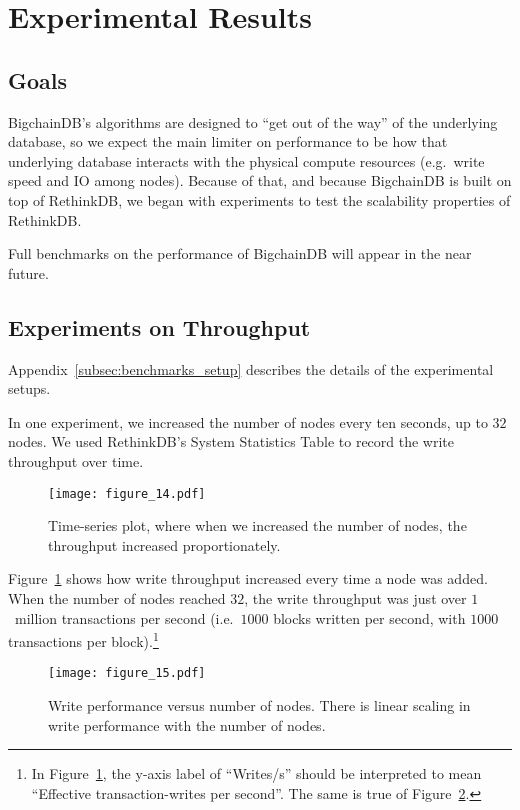 \section{Experimental Results}\label{sec:benchmarks}

\subsection{Goals}

BigchainDB's algorithms are designed to ``get out of the way'' of the underlying database, so we expect the main limiter on performance to be how that underlying database interacts with the physical compute resources (e.g.~write speed and IO among nodes).
Because of that, and because BigchainDB is built on top of RethinkDB, we began with experiments to test the scalability properties of RethinkDB.

Full benchmarks on the performance of BigchainDB will appear in the near future.

\subsection{Experiments on Throughput}

Appendix~\ref{subsec:benchmarks_setup} describes the details of the experimental setups.

In one experiment, we increased the number of nodes every ten seconds, up to $32$ nodes.
We used RethinkDB's System Statistics Table to record the write throughput over time.

\begin{figure}[!ht]
  \centering
  \texttt{[image: figure\_14.pdf]}
  \caption{Time-series plot, where when we increased the number of nodes, the throughput increased proportionately.}
  \label{fig:bigchain_throughput_vs_nodes}
\end{figure}

Figure~\ref{fig:bigchain_throughput_vs_nodes} shows how write throughput increased every time a node was added.
When the number of nodes reached $32$, the write throughput was just over $1$~million transactions per second (i.e.~$1000$ blocks written per second, with $1000$ transactions per block).\footnote{
In Figure~\ref{fig:bigchain_throughput_vs_nodes}, the y-axis label of ``Writes/s'' should be interpreted to mean ``Effective transaction-writes per second''. The same is true of Figure~\ref{fig:bigchain_writes_vs_nodes}.}

\begin{figure}[!ht]
  \centering
  \texttt{[image: figure\_15.pdf]}
  \caption{Write performance versus number of nodes. There is linear scaling in write performance with the number of nodes.}
  \label{fig:bigchain_writes_vs_nodes}
\end{figure}

